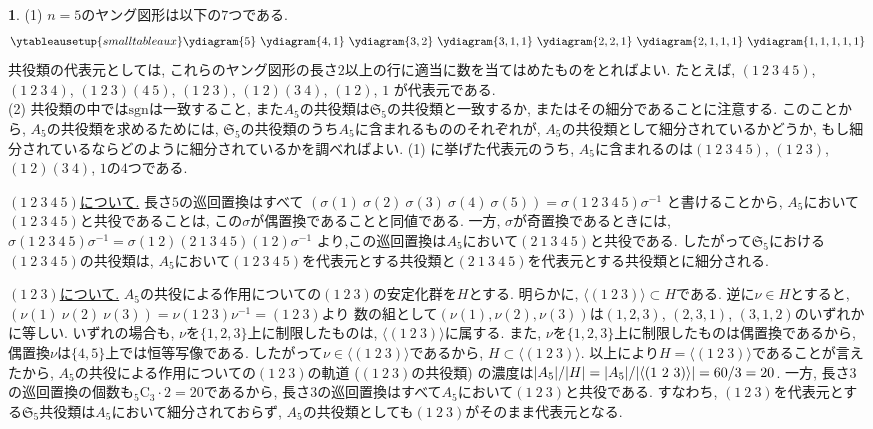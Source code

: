 \documentclass{amsart}
\theoremstyle{definition}
\newtheorem{ans}{}
\numberwithin{ans}{subsection}
\DeclarePairedDelimiter{\abs}{\lvert}{\rvert}
\begin{document}
\begin{ans}
  (1) $n = 5$のヤング図形は以下の$7$つである.
  \begin{align*}
    \ytableausetup{smalltableaux}
    \ydiagram{5}\ \ydiagram{4, 1}\ \ydiagram{3, 2}\ \ydiagram{3, 1, 1}\ \ydiagram{2, 2, 1}\ \ydiagram{2, 1, 1, 1}\ \ydiagram{1, 1, 1, 1, 1}
  \end{align*}
  共役類の代表元としては, これらのヤング図形の長さ$2$以上の行に適当に数を当てはめたものをとればよい.
  たとえば, $(1\ 2\ 3\ 4\ 5)$, $(1\ 2\ 3\ 4)$, $(1\ 2\ 3)(4\ 5)$, $(1\ 2\ 3)$, $(1\ 2)(3\ 4)$, $(1\ 2)$, $1$
  が代表元である.\\
  (2) 共役類の中では$\mathrm{sgn}$は一致すること,
  また$A_5$の共役類は$\mathfrak{S}_5$の共役類と一致するか, またはその細分であることに注意する.
  このことから, $A_5$の共役類を求めるためには, $\mathfrak{S}_5$の共役類のうち$A_5$に含まれるもののそれぞれが, $A_5$の共役類として細分されているかどうか,
  もし細分されているならどのように細分されているかを調べればよい.
  (1) に挙げた代表元のうち, $A_5$に含まれるのは$(1\ 2\ 3\ 4\ 5)$, $(1\ 2\ 3)$, $(1\ 2)(3\ 4)$, $1$の$4$つである.

  \underline{$(1\ 2\ 3\ 4\ 5)$について.}
  長さ$5$の巡回置換はすべて
  $(\sigma(1)\ \sigma(2)\ \sigma(3)\ \sigma(4)\ \sigma(5)) = \sigma(1\ 2\ 3\ 4\ 5)\sigma^{-1}$
  と書けることから, $A_5$において$(1\ 2\ 3\ 4\ 5)$と共役であることは, この$\sigma$が偶置換であることと同値である.
  一方, $\sigma$が奇置換であるときには,
  $\sigma(1\ 2\ 3\ 4\ 5)\sigma^{-1} = \sigma(1\ 2)(2\ 1\ 3\ 4\ 5)(1\ 2)\sigma^{-1}$
  より,この巡回置換は$A_5$において$(2\ 1\ 3\ 4\ 5)$と共役である.
  したがって$\mathfrak{S}_5$における$(1\ 2\ 3\ 4\ 5)$の共役類は,
  $A_5$において$(1\ 2\ 3\ 4\ 5)$を代表元とする共役類と$(2\ 1\ 3\ 4\ 5)$を代表元とする共役類とに細分される.

  \underline{$(1\ 2\ 3)$について.}
  $A_5$の共役による作用についての$(1\ 2\ 3)$の安定化群を$H$とする.
  明らかに, $\langle(1\ 2\ 3)\rangle \subset H$である.
  逆に$\nu \in H$とすると, $(\nu(1)\ \nu(2)\ \nu(3)) = \nu(1\ 2\ 3)\nu^{-1} = (1\ 2\ 3)$より
  数の組として$(\nu(1), \nu(2), \nu(3))$は$(1, 2, 3)$, $(2, 3, 1)$, $(3, 1, 2)$のいずれかに等しい.
  いずれの場合も, $\nu$を$\{1, 2, 3\}$上に制限したものは, $\langle(1\ 2\ 3)\rangle$に属する.
  また, $\nu$を$\{1, 2, 3\}$上に制限したものは偶置換であるから, 偶置換$\nu$は$\{4, 5\}$上では恒等写像である.
  したがって$\nu \in \langle(1\ 2\ 3)\rangle$であるから, $H \subset \langle(1\ 2\ 3)\rangle$.
  以上により$H = \langle(1\ 2\ 3)\rangle$であることが言えたから,
  $A_5$の共役による作用についての$(1\ 2\ 3)$の軌道 ($(1\ 2\ 3)$の共役類) の濃度は$\abs{A_5}/\abs{H} = \abs{A_5}/\abs{\langle(1\ 2\ 3)\rangle} = 60 / 3 = 20$.
  一方, 長さ$3$の巡回置換の個数も${}_5\mathrm{C}_3 \cdot 2 = 20$であるから,
  長さ$3$の巡回置換はすべて$A_5$において$(1\ 2\ 3)$と共役である.
  すなわち, $(1\ 2\ 3)$を代表元とする$\mathfrak{S}_5$共役類は$A_5$において細分されておらず, $A_5$の共役類としても$(1\ 2\ 3)$がそのまま代表元となる.


\end{ans}
\end{document}
